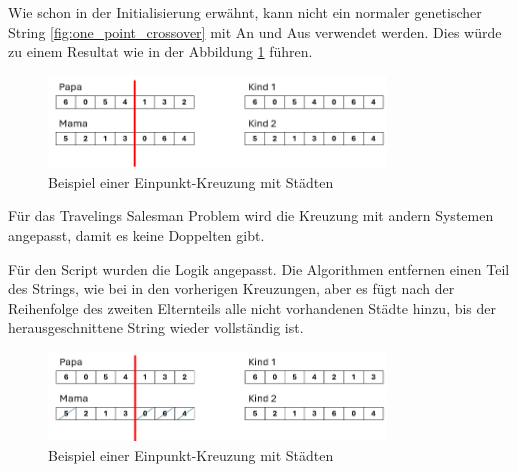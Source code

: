 Wie schon in der Initialisierung erwähnt, kann nicht ein normaler 
genetischer String \ref{fig:one_point_crossover} mit An und 
Aus verwendet werden. Dies würde zu einem Resultat wie in der Abbildung 
\ref{fig:one_point_crossover_cities} führen.

\begin{figure}
	\centering
	\includegraphics[width=0.8\textwidth]{
		papers/varalg/images/teil3/07_genetic_string_cities_crossover_standard.png
	}
	\caption{Beispiel einer Einpunkt-Kreuzung mit Städten}
	\label{fig:one_point_crossover_cities}
\end{figure}

Für das Travelings Salesman Problem wird die Kreuzung mit andern Systemen 
angepasst, damit es keine Doppelten gibt.

Für den Script wurden die Logik angepasst. Die Algorithmen entfernen einen 
Teil des Strings, wie bei in den vorherigen Kreuzungen, aber es fügt nach 
der Reihenfolge des zweiten Elternteils alle nicht vorhandenen 
Städte hinzu, bis der herausgeschnittene String wieder vollständig ist.

\begin{figure}
	\centering
	\includegraphics[width=0.8\textwidth]{
		papers/varalg/images/teil3/08_genetic_string_cities_crossover_simple.png
	}
	\caption{Beispiel einer Einpunkt-Kreuzung mit Städten}
	\label{fig:crossover_order_cities}
\end{figure}


